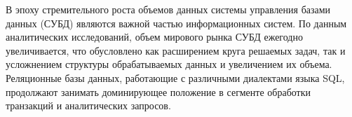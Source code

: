 \documentclass[fontsize=14pt, russian]{scrartcl}
\begin{document}
\sloppy

\def\figurename{Рисунок}

\newcommand{\sqlkw}[1]{\texttt{#1}}
\newcommand{\SELECT}{\sqlkw{SELECT}}
\newcommand{\FROM}{\sqlkw{FROM}}
\newcommand{\WHERE}{\sqlkw{WHERE}}
\newcommand{\JOIN}{\sqlkw{JOIN}}
\newcommand{\GROUPBY}{\sqlkw{GROUP BY}}
\newcommand{\ORDERBY}{\sqlkw{ORDER BY}}

\newcommand{\COUNT}{\sqlkw{COUNT}}
\newcommand{\SUM}{\sqlkw{SUM}}
\newcommand{\AVG}{\sqlkw{AVG}}
\newcommand{\MIN}{\sqlkw{MIN}}
\newcommand{\MAX}{\sqlkw{MAX}}

\newcommand{\LogicalGet}{\sqlkw{LogicalGet}}
\newcommand{\SeqScan}{\sqlkw{SeqScan}}
\newcommand{\IndexScan}{\sqlkw{IndexScan}}
\newcommand{\NestedLoopJoin}{\sqlkw{NestedLoopJoin}}
\newcommand{\NestedLoopCrossJoin}{\sqlkw{NestedLoopCrossJoin}}
\newcommand{\HashJoin}{\sqlkw{HashJoin}}
\newcommand{\MergeJoin}{\sqlkw{MergeJoin}}
\newcommand{\Sort}{\sqlkw{Sort}}
\newcommand{\FilterOp}{\sqlkw{Filter}}
\newcommand{\ProjOp}{\sqlkw{Projection}}

\newcommand{\SelOp}[1]{\sigma_{#1}}
\newcommand{\ProjectionOp}[1]{\pi_{#1}}

\newcommand{\Sel}[2]{\sigma_{#1}(#2)}
\newcommand{\Projection}[2]{\pi_{#1}(#2)}
\newcommand{\Agg}[3]{\gamma_{#1;\,#2}(#3)}
\newcommand{\AggP}[3]{\gamma_{#1;\,#2}^{partial}(#3)}
\newcommand{\NJoin}[2]{#1 \bowtie #2}
\newcommand{\InnerJoin}[3]{#1 \bowtie_{#2} #3}
\newcommand{\CProd}[2]{#1 \times #2}
\newcommand{\LOJ}[3]{#1 \ltimes_{#2} #3}
\newcommand{\ROJ}[3]{#1 \rtimes_{#2} #3}
\newcommand{\FOJ}[3]{#1 \mathbin{\ltimes\!\!\!\rtimes}_{#2} #3}
\newcommand{\Tr}[1]{[\![ #1 ]\!]}
\newcommand{\Apply}[2]{#1 \mathbin{\mathcal{A}} #2}
\newcommand{\TransRule}[3]{%
  \ensuremath{%
    \begin{array}{c}
      #1 \\[1pt]
      \xRightarrow{\,#2\,} \\[1pt]
      #3
    \end{array}%
  }%
}

\setlength{\tabcolsep}{3pt}
\setcounter{page}{2}

\newpage
\renewcommand\contentsname{\hfill{\normalfont{СОДЕРЖАНИЕ}}\hfill}
\tableofcontents
\newpage
{}

В эпоху стремительного роста объемов данных системы управления базами данных
(СУБД) являются важной частью информационных систем. По данным аналитических
исследований, объем мирового рынка СУБД ежегодно увеличивается, что обусловлено
как расширением круга решаемых задач, так и усложнением структуры обрабатываемых
данных и увеличением их объема. Реляционные базы данных, работающие с различными
диалектами языка SQL, продолжают занимать доминирующее положение в сегменте
обработки транзакций и аналитических запросов.
\end{document}

